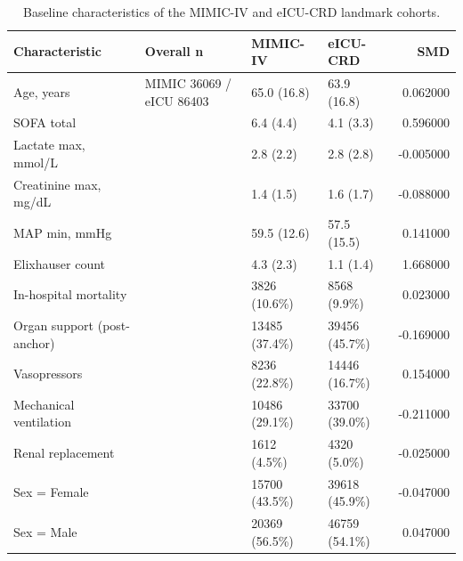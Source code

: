 \begin{table}
\caption{Baseline characteristics of the MIMIC-IV and eICU-CRD landmark cohorts.}
\label{tab:baseline}
\begin{tabular}{llllr}
\toprule
Characteristic & Overall n & MIMIC-IV & eICU-CRD & SMD \\
\midrule
Age, years & MIMIC 36069 / eICU 86403 & 65.0 (16.8) & 63.9 (16.8) & 0.062000 \\
SOFA total &  & 6.4 (4.4) & 4.1 (3.3) & 0.596000 \\
Lactate max, mmol/L &  & 2.8 (2.2) & 2.8 (2.8) & -0.005000 \\
Creatinine max, mg/dL &  & 1.4 (1.5) & 1.6 (1.7) & -0.088000 \\
MAP min, mmHg &  & 59.5 (12.6) & 57.5 (15.5) & 0.141000 \\
Elixhauser count &  & 4.3 (2.3) & 1.1 (1.4) & 1.668000 \\
In-hospital mortality &  & 3826 (10.6\%) & 8568 (9.9\%) & 0.023000 \\
Organ support (post-anchor) &  & 13485 (37.4\%) & 39456 (45.7\%) & -0.169000 \\
Vasopressors &  & 8236 (22.8\%) & 14446 (16.7\%) & 0.154000 \\
Mechanical ventilation &  & 10486 (29.1\%) & 33700 (39.0\%) & -0.211000 \\
Renal replacement &  & 1612 (4.5\%) & 4320 (5.0\%) & -0.025000 \\
Sex = Female &  & 15700 (43.5\%) & 39618 (45.9\%) & -0.047000 \\
Sex = Male &  & 20369 (56.5\%) & 46759 (54.1\%) & 0.047000 \\
\bottomrule
\end{tabular}
\end{table}
